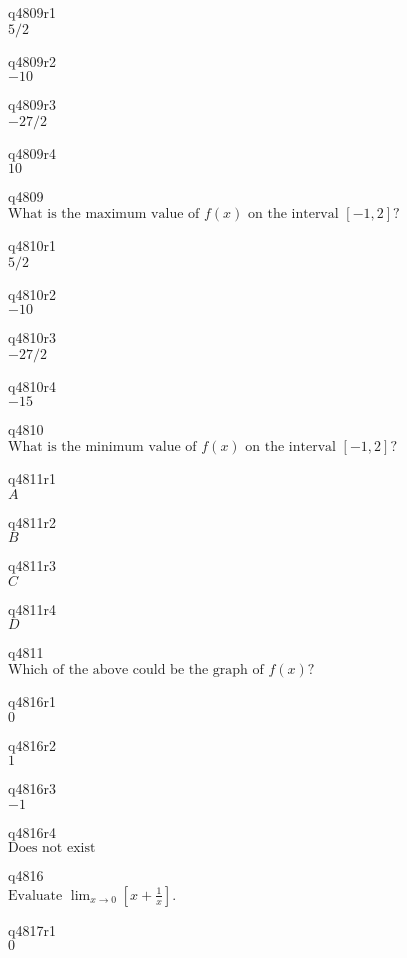 q4809r1\\
\(\displaystyle 5/2 \)

q4809r2\\
\(\displaystyle -10 \)

q4809r3\\
\(\displaystyle -27/2 \)

q4809r4\\
\(\displaystyle 10 \)

q4809\\
\(\displaystyle \text{What is the maximum value of } f(x) \text{ on the interval } [-1, 2]? \)

q4810r1\\
\(\displaystyle 5/2 \)

q4810r2\\
\(\displaystyle -10 \)

q4810r3\\
\(\displaystyle -27/2 \)

q4810r4\\
\(\displaystyle -15 \)

q4810\\
\(\displaystyle \text{What is the minimum value of } f(x) \text{ on the interval } [-1, 2]? \)

q4811r1\\
\(\displaystyle A \)

q4811r2\\
\(\displaystyle B \)

q4811r3\\
\(\displaystyle C \)

q4811r4\\
\(\displaystyle D \)

q4811\\
\(\displaystyle \text{Which of the above could be the graph of } f(x)? \)

q4816r1\\
\(\displaystyle 0 \)

q4816r2\\
\(\displaystyle 1 \)

q4816r3\\
\(\displaystyle -1 \)

q4816r4\\
\(\displaystyle \text{Does not exist} \)

q4816\\
\(\displaystyle \text{Evaluate } \lim_{x \rightarrow 0} [ x + \frac{1}{x}]. \)

q4817r1\\
\(\displaystyle 0 \)

